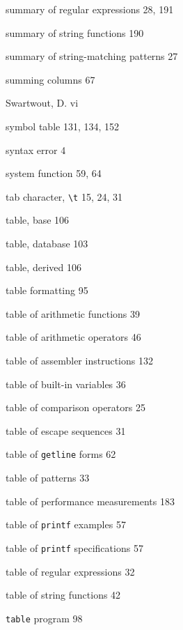 \begin{multicols}{3}
\hangindent=3pc  summary of regular expressions 28, 191

\hangindent=3pc  summary of string functions 190

\hangindent=3pc  summary of string-matching patterns 27

\hangindent=3pc  summing columns 67

\hangindent=3pc  Swartwout, D. vi

\hangindent=3pc  symbol table 131, 134, 152

\hangindent=3pc  syntax error 4

\hangindent=3pc  system function 59, 64

\hangindent=3pc  tab character, \verb'\t' 15, 24, 31

\hangindent=3pc  table, base 106

\hangindent=3pc  table, database 103

\hangindent=3pc  table, derived 106

\hangindent=3pc  table formatting 95

\hangindent=3pc  table of arithmetic functions 39

\hangindent=3pc  table of arithmetic operators 46

\hangindent=3pc  table of assembler instructions 132

\hangindent=3pc  table of built-in variables 36

\hangindent=3pc  table of comparison operators 25

\hangindent=3pc  table of escape sequences 31

\hangindent=3pc  table of \verb'getline' forms 62

\hangindent=3pc  table of patterns 33

\hangindent=3pc  table of performance measurements 183

\hangindent=3pc  table of \verb'printf' examples 57

\hangindent=3pc  table of \verb'printf' specifications 57

\hangindent=3pc  table of regular expressions 32

\hangindent=3pc  table of string functions 42

\hangindent=3pc  \verb'table' program 98


\end{multicols}
